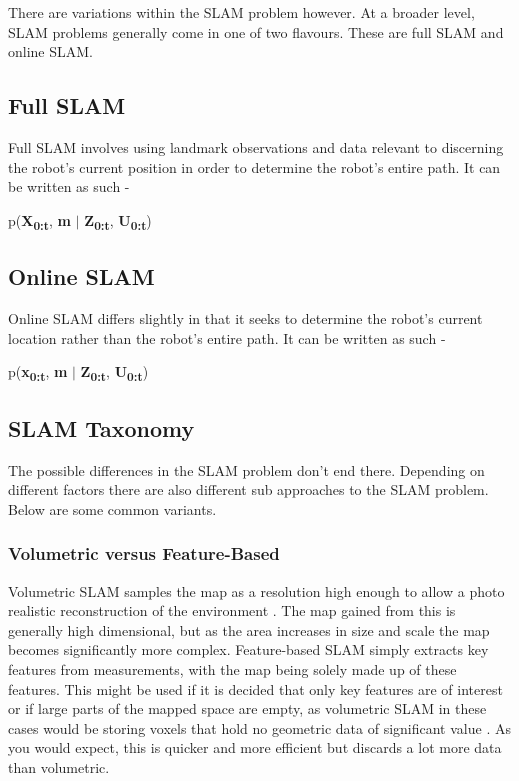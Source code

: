 			There are variations within the SLAM problem however. At a broader level, SLAM problems generally come in one of two flavours. These are full SLAM and online SLAM. 

				\subsection{Full SLAM}
				Full SLAM involves using landmark observations and data relevant to discerning the robot's current position in order to determine the robot's entire path. It can be written as such -
				
				p(\textbf{X\textsubscript{0:t}}, \textbf{m} $\mid$ \textbf{Z\textsubscript{0:t}}, \textbf{U\textsubscript{0:t}})
				
				\subsection{Online SLAM}
				Online SLAM differs slightly in that it seeks to determine the robot's current location rather than the robot's entire path. It can be written as such - 
				
				p(\textbf{x\textsubscript{0:t}}, \textbf{m} $\mid$ \textbf{Z\textsubscript{0:t}}, \textbf{U\textsubscript{0:t}})
				
				\subsection{SLAM Taxonomy}
				The possible differences in the SLAM problem don't end there. Depending on different factors there are also different sub approaches to the SLAM problem. Below are some common variants.
				
					\subsubsection{Volumetric versus Feature-Based}
					Volumetric SLAM samples the map as a resolution high enough to allow a photo realistic reconstruction of the environment \citep{thrun2008simultaneous}. The map gained from this is generally high dimensional, but as the area increases in size and scale the map becomes significantly more complex. Feature-based SLAM simply extracts key features from measurements, with the map being solely made up of these features. This might be used if it is decided that only key features are of interest or if large parts of the mapped space are empty, as volumetric SLAM in these cases would be storing voxels that hold no geometric data of significant value \citep{vespa2018efficient}. As you would expect, this is quicker and more efficient but discards a lot more data than volumetric. 
					
